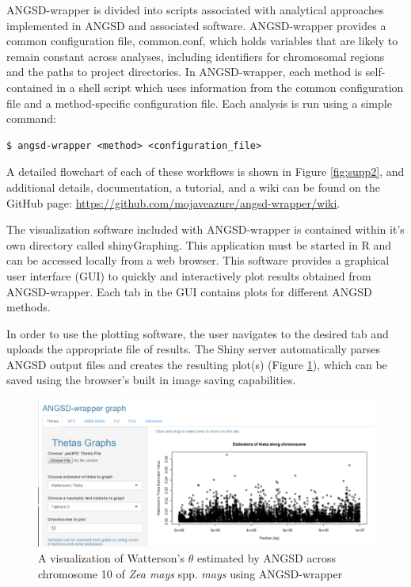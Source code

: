 \documentclass[10pt,a4paper]{article}
\begin{document}
ANGSD-wrapper is divided into scripts associated with analytical approaches implemented in ANGSD and associated software. ANGSD-wrapper provides a common configuration file, common.conf, which  holds variables that are likely to remain constant across analyses, including identifiers for chromosomal regions and the paths to project directories.
In ANGSD-wrapper, each method is self-contained in a shell script which uses information from the common configuration file and a method-specific configuration file. 
Each analysis is run using a simple command:

\begin{lstlisting}
$ angsd-wrapper <method> <configuration_file>
\end{lstlisting}

A detailed flowchart of each of these workflows is shown in Figure \ref{fig:supp2}, and additional details, documentation, a tutorial, and a wiki can be found on the GitHub page: \url{https://github.com/mojaveazure/angsd-wrapper/wiki}.

The visualization software included with ANGSD-wrapper is contained within
it's own directory called shinyGraphing.
This application must be started in R and can be accessed locally from a web browser. This software provides a graphical user interface (GUI) to quickly and interactively plot results obtained from ANGSD-wrapper.  
Each tab in the GUI contains plots for different ANGSD methods.

In order to use the plotting software, the user navigates to the desired tab and uploads the appropriate file of results. 
The Shiny server automatically parses ANGSD output files and creates the resulting plot(s) (Figure \ref{fig:theta}), which can be saved using the browser's built in image saving capabilities. 

\begin{figure}
\centering
\includegraphics[width=130mm]{figures/ThetasPlot.png}
\caption{A visualization of Watterson's $\theta$ estimated by ANGSD across chromosome 10 of {\it Zea mays} spp. {\it mays} using ANGSD-wrapper\label{fig:theta} }
\end{figure}
\end{document}
